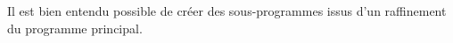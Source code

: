 \documentclass[11pt]{article}
\makeatletter
\newcommand{\boxspacing}{\kern\kvtcb@left@rule\kern\kvtcb@boxsep}
\newcommand{\prompt}[4]{
        {\ttfamily\llap{{\color{#2}[#3]:\hspace{3pt}#4}}\vspace{-\baselineskip}}
    }
\makeatother
\begin{document}
Il est bien entendu possible de créer des sous-programmes issus d'un
raffinement du programme principal.

    \begin{tcolorbox}[breakable, size=fbox, boxrule=1pt, pad at break*=1mm,colback=cellbackground, colframe=cellborder]
\prompt{In}{incolor}{ }{\boxspacing}
\begin{Verbatim}[commandchars=\\\{\}]

\end{Verbatim}
\end{tcolorbox}


    
    
    
\end{document}
